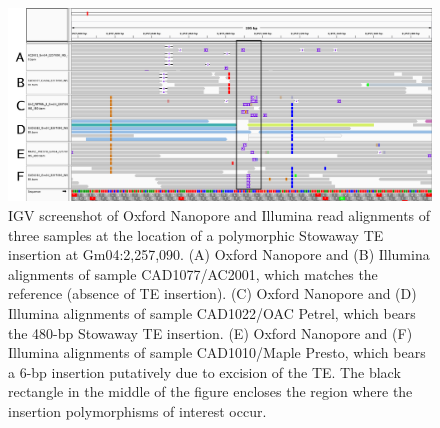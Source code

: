 \documentclass[12pt]{article}
\newenvironment{lsfigure}
	{\begin{landscape} \begin{figure} \centering}
	{\end{figure} \end{landscape}}
\begin{document}
\begin{lsfigure}
	\includegraphics[width = 9.5in]{Gm04_2257090_annotated}

	\caption[IGV screenshot of Oxford Nanopore and Illumina read alignments of three samples at the location of a polymorphic Stowaway TE insertion]{
		IGV screenshot of Oxford Nanopore and Illumina read alignments of three samples at the location of a polymorphic Stowaway TE insertion at Gm04:2,257,090.
		(A) Oxford Nanopore and (B) Illumina alignments of sample CAD1077/AC2001, which matches the reference (absence of TE insertion).
		(C) Oxford Nanopore and (D) Illumina alignments of sample CAD1022/OAC Petrel, which bears the 480-bp Stowaway TE insertion.
		(E) Oxford Nanopore and (F) Illumina alignments of sample CAD1010/Maple Presto, which bears a 6-bp insertion putatively due to excision of the TE.
		The black rectangle in the middle of the figure encloses the region where the insertion polymorphisms of interest occur.
	}

	\label{fig_s20}

\end{lsfigure}

\clearpage%




\end{document}
